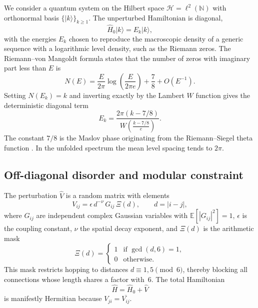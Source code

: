 \documentclass[aps,prl,preprint,superscriptaddress,floatfix]{revtex4-2}
\newcommand{\Hilb}{\mathcal{H}}
\begin{document}
We consider a quantum system on the Hilbert space $\Hilb = \ell^2(\mathbb{N})$ with orthonormal basis $\{|k\rangle\}_{k\ge 1}$. The unperturbed Hamiltonian is diagonal,
\begin{equation}
\hat H_0 |k\rangle = E_k |k\rangle,
\end{equation}
with the energies $E_k$ chosen to reproduce the macroscopic density of a generic sequence with a logarithmic level density, such as the Riemann zeros. The Riemann--von Mangoldt formula states that the number of zeros with imaginary part less than $E$ is
\begin{equation}
N(E) = \frac{E}{2\pi}\log\left(\frac{E}{2\pi e}\right) + \frac{7}{8} + O(E^{-1}).
\end{equation}
Setting $N(E_k)=k$ and inverting exactly by the Lambert $W$ function gives the deterministic diagonal term
\begin{equation}
\boxed{ E_k = \frac{2\pi (k - 7/8)}{W\!\left(\frac{k-7/8}{e}\right)} }.
\label{eq:diag}
\end{equation}
The constant $7/8$ is the Maslov phase originating from the Riemann--Siegel theta function \cite{Corless1996}. In the unfolded spectrum the mean level spacing tends to $2\pi$.

\subsection{Off-diagonal disorder and modular constraint}

The perturbation $\hat V$ is a random matrix with elements
\begin{equation}
V_{ij} = \epsilon \, d^{-\nu} \, G_{ij} \, \Xi(d),
\qquad d = |i-j|,
\end{equation}
where $G_{ij}$ are independent complex Gaussian variables with $\mathbb{E}[|G_{ij}|^2]=1$, $\epsilon$ is the coupling constant, $\nu$ the spatial decay exponent, and $\Xi(d)$ is the arithmetic mask
\begin{equation}
\Xi(d) = \begin{cases}
1 & \text{if } \gcd(d,6)=1,\\
0 & \text{otherwise}.
\end{cases}
\end{equation}
This mask restricts hopping to distances $d\equiv1,5\pmod6$, thereby blocking all connections whose length shares a factor with~6. The total Hamiltonian
\begin{equation}
\hat H = \hat H_0 + \hat V
\label{eq:fullH}
\end{equation}
is manifestly Hermitian because $V_{ji} = \overline{V_{ij}}$.
\end{document}
